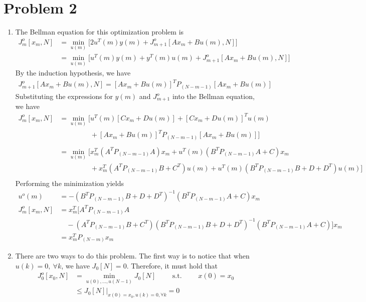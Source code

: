 \section*{Problem 2}

\begin{enumerate}
\item
The Bellman equation for this optimization problem is
\begin{align*}
    J_m^o[x_m,N] & = \min_{u(m)} \Big[ 2 u^T(m) y(m) + J_{m+1}^o[Ax_m + Bu(m),N] \Big] \\
    & = \min_{u(m)} \Big[ u^T(m) y(m) + y^T(m) u(m) + J_{m+1}^o[Ax_m + Bu(m),N] \Big]
\end{align*}
By the induction hypothesis, we have 
\begin{align*}
    J_{m+1}^o[Ax_m + Bu(m),N] = [Ax_m + Bu(m)]^T P_{(N-m-1)} [Ax_m + Bu(m)]
\end{align*}
Substituting the expressions for $y(m)$ and $J_{m+1}^o$ into the Bellman equation, we have
\begin{align*}
    J_m^o[x_m,N] & = \min_{u(m)} \Big[ u^T(m)[Cx_m + Du(m)] + [Cx_m + Du(m)]^T u(m) \\
    & \phantom{= \min_{u(m)} \Big[} + [Ax_m + Bu(m)]^T P_{(N-m-1)} [Ax_m + Bu(m)] \Big] \\
    & = \min_{u(m)} \Big[ x_m^T (A^T P_{(N-m-1)} A) x_m + u^T(m)(B^T P_{(N-m-1)} A + C) x_m \\
    & \phantom{= \min_{u(m)} \Big[} + x_m^T (A^T P_{(N-m-1)} B + C^T) u(m)
        + u^T(m) (B^T P_{(N-m-1)} B + D + D^T) u(m) \Big]
\end{align*}
Performing the minimization yields
\begin{align*}
    u^o(m) & = - (B^T P_{(N-m-1)} B + D + D^T)^{-1} (B^T P_{(N-m-1)} A + C) x_m \\
    J_m^o[x_m,N] & = x_m^T \Big[ A^T P_{(N-m-1)} A \\
    & \quad - (A^T P_{(N-m-1)} B + C^T) (B^T P_{(N-m-1)} B + D + D^T)^{-1}
        (B^T P_{(N-m-1)} A + C) \Big] x_m \\
    & = x_m^T P_{(N-m)} x_m
\end{align*}



\item
There are two ways to do this problem. The first way is to notice that when $u(k) = 0, \ \forall k$, we have $J_0[N] = 0$. Therefore, it must hold that
\begin{align*}
    J_0^o[x_0,N] & = \min_{u(0),\ldots,u(N-1)} J_0[N] \qquad \textrm{ s.t. } \qquad x(0) = x_0 \\
    & \leq J_0[N] \Big|_{x(0) = x_0, u(k) = 0, \forall k} = 0
\end{align*}


\end{enumerate}
